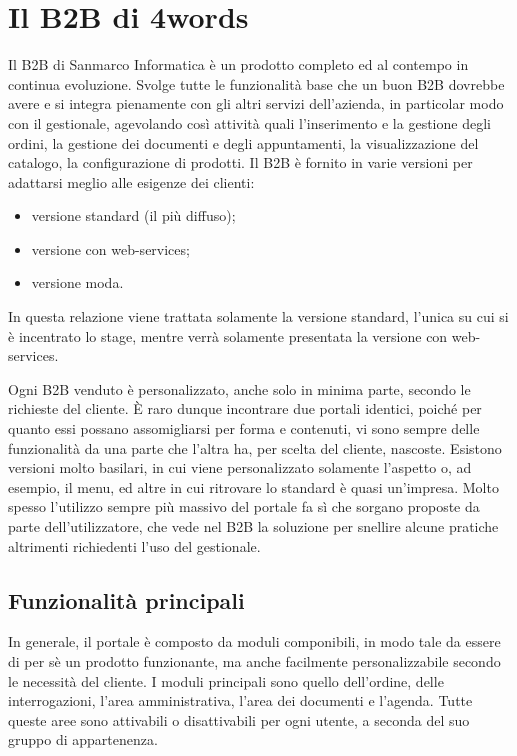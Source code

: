 \section{Il B2B di 4words}
Il B2B di Sanmarco Informatica è un prodotto completo ed al contempo in continua evoluzione. Svolge tutte le funzionalità base che un buon B2B dovrebbe avere e si integra pienamente con gli altri servizi dell'azienda, in particolar modo con il gestionale, agevolando così attività quali l'inserimento e la gestione degli ordini, la gestione dei documenti e degli appuntamenti, la visualizzazione del catalogo, la configurazione di prodotti. Il B2B è fornito in varie versioni per adattarsi meglio alle esigenze dei clienti:
\begin{itemize}
	\item versione standard (il più diffuso);
	\item versione con web-services;
	\item versione moda.
\end{itemize}
In questa relazione viene trattata solamente la versione standard, l'unica su cui si è incentrato lo stage, mentre verrà solamente presentata la versione con web-services.

Ogni B2B venduto è personalizzato, anche solo in minima parte, secondo le richieste del cliente. È raro dunque incontrare due portali identici, poiché per quanto essi possano assomigliarsi per forma e contenuti, vi sono sempre delle funzionalità da una parte che l'altra ha, per scelta del cliente, nascoste.
Esistono versioni molto basilari, in cui viene personalizzato solamente l'aspetto o, ad esempio, il menu, ed altre in cui ritrovare lo standard è quasi un'impresa. Molto spesso l'utilizzo sempre più massivo del portale fa sì che sorgano proposte da parte dell'utilizzatore, che vede nel B2B la soluzione per snellire alcune pratiche altrimenti richiedenti l'uso del gestionale.

\subsection{Funzionalità principali}
In generale, il portale è composto da moduli componibili, in modo tale da essere di per sè un prodotto funzionante, ma anche facilmente personalizzabile secondo le necessità del cliente. I moduli principali sono quello dell'ordine, delle interrogazioni, l'area amministrativa, l'area dei documenti e l'agenda. Tutte queste aree sono attivabili o disattivabili per ogni utente, a seconda del suo gruppo di appartenenza. 


